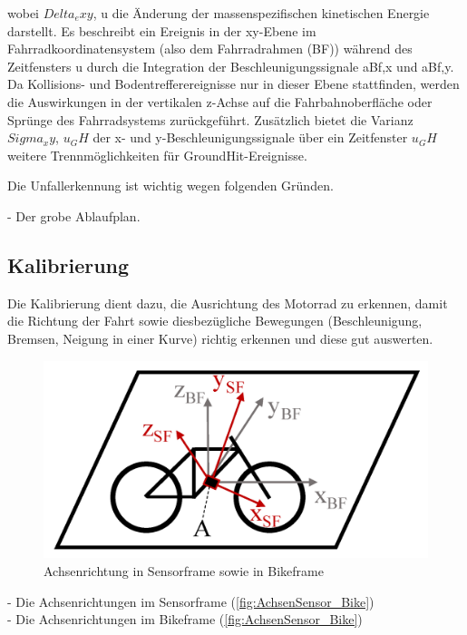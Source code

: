 wobei $Delta_exy$, u die Änderung der massenspezifischen kinetischen Energie darstellt. Es beschreibt ein Ereignis in der xy-Ebene im Fahrradkoordinatensystem (also dem Fahrradrahmen (BF)) während des Zeitfensters u durch die Integration der Beschleunigungssignale aBf,x und aBf,y. Da Kollisions- und Bodentrefferereignisse nur in dieser Ebene stattfinden, werden die Auswirkungen in der vertikalen z-Achse auf die Fahrbahnoberfläche oder Sprünge des Fahrradsystems zurückgeführt. Zusätzlich bietet die Varianz $Sigma_xy$, $u_GH$ der x- und y-Beschleunigungssignale über ein Zeitfenster $u_GH$ weitere Trennmöglichkeiten für GroundHit-Ereignisse. \cite{Schneeclassification2021}




Die Unfallerkennung ist wichtig wegen folgenden Gründen.


- Der grobe Ablaufplan.\\



\subsection{Kalibrierung}
Die Kalibrierung dient dazu, die Ausrichtung des Motorrad zu erkennen, damit die Richtung der Fahrt sowie diesbezügliche Bewegungen (Beschleunigung, Bremsen, Neigung in einer Kurve) richtig erkennen und diese gut auswerten.\\


\begin{figure}[H]
	\centering
	\includegraphics[width=0.7\linewidth]{Bilder/AchsenSensor_Bike.png}
	\caption{Achsenrichtung in Sensorframe sowie in Bikeframe \cite{SchneeCorrection2020}}
	\label{fig:AchsenSensor_Bike}
\end{figure}


- Die Achsenrichtungen im Sensorframe (\autoref{fig:AchsenSensor_Bike})\\

- Die Achsenrichtungen im Bikeframe (\autoref{fig:AchsenSensor_Bike})\\

